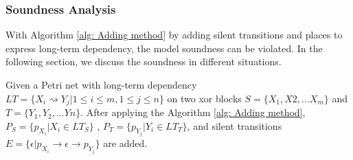 \subsubsection{Soundness Analysis}
With Algorithm \ref{alg: Adding method} by adding silent transitions and places to express long-term dependency, the model soundness can be violated. In the following section, we discuss the soundness in different situations. 

Given a Petri net with long-term dependency $LT=\{X_i \rightsquigarrow Y_j \vert 1 \leq i \leq m, 1 \leq j \leq n \}$ on two xor blocks $S=\{X_1,X2,...X_m\}$ and $T=\{Y_1,Y_2,...Yn\}$. After applying the Algorithm \ref{alg: Adding method}, $P_S=\{p_{X_i} \vert X_i \in LT_{S} \}$ , $P_T=\{p_{Y_j} \vert Y_i \in LT_{T} \}$, and silent transitions $ E = \{\epsilon \vert p_{X_i} \rightarrow \epsilon
\rightarrow p_{Y_{j}} \}$ are added. 
 
